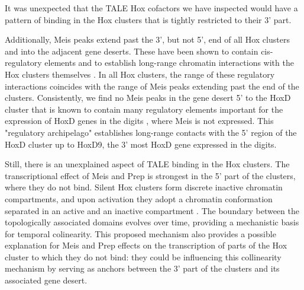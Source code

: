 It was unexpected that the \ac{TALE} Hox cofactors we have inspected would have a pattern of binding in the Hox clusters that is tightly restricted to their 3' part. %

Additionally, Meis peaks extend past the 3', but not 5', end of all Hox clusters and into the adjacent gene deserts. These have been shown to contain cis-regulatory elements and to establish long-range chromatin interactions with the Hox clusters themselves \parencite{Noordermeer2011, Andrey2013}. In all Hox clusters, the range of these regulatory interactions coincides with the range of Meis peaks extending past the end of the clusters. Consistently, we find no Meis peaks in the gene desert 5' to the HoxD cluster that is known to contain many regulatory elements important for the expression of HoxD genes in the digits \parencite{Montavon2011}, where Meis is not expressed. This "regulatory archipelago" establishes long-range contacts with the 5' region of the HoxD cluster up to HoxD9, the 3' most HoxD gene expressed in the digits. 

Still, there is an unexplained aspect of \ac{TALE} binding in the Hox clusters. The transcriptional effect of Meis and Prep is strongest in the 5' part of the clusters, where they do not bind. Silent Hox clusters form discrete inactive chromatin compartments, and upon activation they adopt a chromatin conformation separated in an active and an inactive compartment \parencite{Noordermeer2011}. The boundary between the topologically associated domains evolves over time, providing a mechanistic basis for temporal colinearity. This proposed mechanism also provides a possible explanation for Meis and Prep effects on the transcription of parts of the Hox cluster to which they do not bind: they could be influencing this collinearity mechanism by serving as anchors between the 3' part of the clusters and its associated gene desert. 



